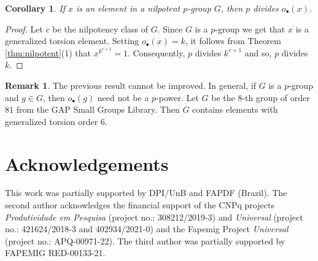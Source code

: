 \documentclass[12pt,leqno]{amsart}
\newtheorem{cor}[theorem]{\sc Corollary}
\theoremstyle{definition}
\newtheorem{rem}[theorem]{\sc Remark}
\begin{document}
\begin{cor}\label{cor:pdivides-gen-order}
If $x$ is an element in a nilpotent $p$-group $G$, then  $p$ divides $o_{\bullet}(x)$.  
\end{cor}

\begin{proof}
Let $c$ be the nilpotency class of $G$. Since $G$ is a $p$-group we get that $x$ is a generalized torsion element. Setting $o_{\bullet}(x)=k$, it follows from Theorem \ref{thm:nilpotent}(1) that $x^{k^{c+1}}=1$. Consequently, $p$ divides $k^{c+1}$ and so, $p$ divides $k$.   
\end{proof}


\begin{rem}
The previous result cannot be improved. In general, if $G$ is a $p$-group and $g\in G$, then $o_{\bullet}(g)$ need not be a $p$-power. Let $G$ be the $8$-th group of order $81$ from the GAP Small Groups Library. Then $G$ contains elements with generalized torsion order $6$. 
\end{rem}


\section*{Acknowledgements}
This work was partially supported by DPI/UnB and FAPDF (Brazil). 
The second author acknowledges the financial support of  the CNPq projects 
\textit{Produtividade em Pesquisa} (project no.: 308212/2019-3)  
and \textit{Universal} (project no.: 421624/2018-3 and 402934/2021-0) and the Fapemig Project \emph{Universal} (project no.: APQ-00971-22). 
The third author was partially supported by FAPEMIG  RED-00133-21.
\end{document}
